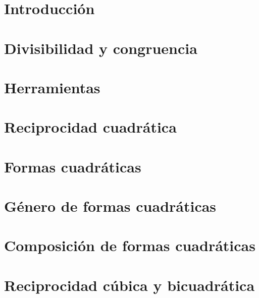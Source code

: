 \part*{Introducci\'on}


\pagebreak
\part{Divisibilidad y congruencia}\label{pt:divisibilidad-y-congruencia}


\pagebreak
\part{Herramientas}\label{pt:herramientas}


\pagebreak
\part{Reciprocidad cuadr\'atica}\label{pt:reciprocidad-cuadratica}


\pagebreak
\part{Formas cuadr\'aticas}\label{pt:formas}


\pagebreak
\part{G\'enero de formas cuadr\'aticas}\label{pt:generos}


\pagebreak
\part{Composici\'on de formas cuadr\'aticas}\label{pt:composicion}


\pagebreak
\part{Reciprocidad c\'ubica y bicuadr\'atica}\label{pt:reciprocidad-superior}


\pagebreak
\printbibliography[heading=bibintoc,title=\refname]

\pagebreak
\tableofcontents
